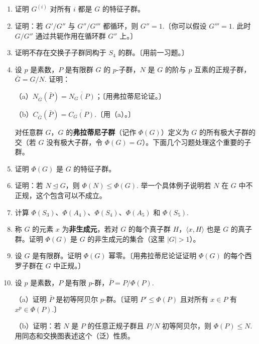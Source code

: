 \begin{enumerate}
\item 证明 \(G^{(i)}\) 对所有 \(i\) 都是 \(G\) 的特征子群。

\item 证明：若 \(G'/G''\) 与 \(G''/G'''\) 都循环，则 \(G'' = 1\).〔你可以假设 \(G''' = 1\). 此时 \(G/G''\) 通过共轭作用在循环群 \(G''\) 上。〕

\item 证明不存在交换子子群同构于 \(S_4\) 的群。〔用前一习题。〕

\item 设 \(p\) 是素数，\(P\) 是有限群 \(G\) 的 \(p\)-子群，\(N\) 是 \(G\) 的阶与 \(p\) 互素的正规子群，\(\bar{G} = G/N\). 证明：

（a）\(N_{\bar{G}}(\bar{P}) = \overline{N_G(P)}\)；〔用弗拉蒂尼论证。〕

（b）\(C_{\bar{G}}(\bar{P}) = \overline{C_G(P)}\).〔用（a）。〕

\noindent 对任意群 \(G\)，\(G\) 的\textbf{弗拉蒂尼子群}（记作 \(\Phi(G)\)）定义为 \(G\) 的所有极大子群的交（若 \(G\) 没有极大子群，令 \(\Phi(G) = G\)）。下面几个习题处理这个重要的子群。

\item 证明 \(\Phi(G)\) 是 \(G\) 的特征子群。

\item 证明：若 \(N \trianglelefteq G\)，则 \(\Phi(N) \leq \Phi(G)\). 举一个具体例子说明若 \(N\) 在 \(G\) 中不正规，这个包含可以不成立。

\item 计算 \(\Phi(S_3)\)、\(\Phi(A_4)\)、\(\Phi(S_4)\)、\(\Phi(A_5)\) 和 \(\Phi(S_5)\).

\item 称 \(G\) 的元素 \(x\) 为\textbf{非生成元}，若对 \(G\) 的每个真子群 \(H\)，\(\langle x, H \rangle\) 也是 \(G\) 的真子群。证明 \(\Phi(G)\) 是 \(G\) 的非生成元的集合（这里 \(|G| > 1\)）。

\item 设 \(G\) 是有限群。证明 \(\Phi(G)\) 幂零。〔用弗拉蒂尼论证证明 \(\Phi(G)\) 的每个西罗子群在 \(G\) 中正规。〕

\item 设 \(p\) 是素数，\(P\) 是有限 \(p\)-群，\(\bar{P} = P/\Phi(P)\).

（a）证明 \(\bar{P}\) 是初等阿贝尔 \(p\)-群。〔证明 \(P' \leq \Phi(P)\) 且对所有 \(x \in P\) 有 \(x^p \in \Phi(P)\).〕

（b）证明：若 \(N\) 是 \(P\) 的任意正规子群且 \(P/N\) 初等阿贝尔，则 \(\Phi(P) \leq N\). 用同态和交换图表述这个（泛）性质。


\end{enumerate}
